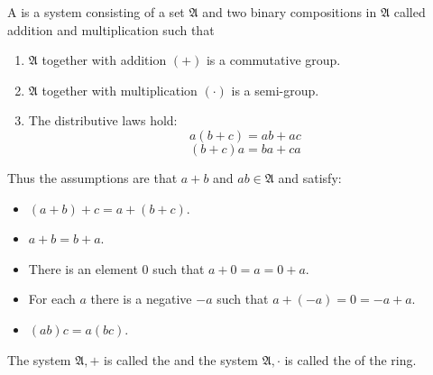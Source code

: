A  is a system consisting of a set $\mathfrak{A}$ and two binary compositions in $\mathfrak{A}$ called addition and multiplication such that

\begin{enumerate}
\item $\mathfrak{A}$ together with addition $(+)$ is a commutative group.
\item $\mathfrak{A}$ together with multiplication $(\cdot)$ is a semi-group.
\item The distributive laws hold:
  $$a(b + c) = ab + ac$$
  $$(b + c)a = ba + ca$$
\end{enumerate}

Thus the assumptions are that $a + b$ and $ab \in \mathfrak{A}$ and satisfy:

\begin{itemize}
\item[A1] $(a + b) + c = a + (b + c)$.
\item[A2] $a + b = b + a$.
\item[A3] There is an element $0$ such that $a + 0 = a = 0 + a$.
\item[A4] For each $a$ there is a negative $-a$ such that $a + (-a) = 0 = -a + a$.
\item[M] $(ab)c = a(bc)$.
\end{itemize}

The system $\mathfrak{A}, +$ is called the  and the system $\mathfrak{A}, \cdot$ is called the  of the ring.
